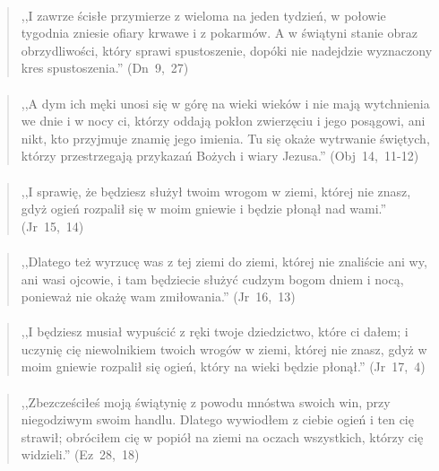 \documentclass[10pt,a4paper,oneside]{article}
\begin{document}
\paragraph{}
\begin{quote}
,,I zawrze ścisłe przymierze z wieloma na jeden tydzień, w połowie tygodnia zniesie ofiary krwawe i z pokarmów. A w świątyni stanie obraz obrzydliwości, który sprawi spustoszenie, dopóki nie nadejdzie wyznaczony kres spustoszenia.'' \mbox{(Dn 9, 27)}
\end{quote}
\paragraph{}
\begin{quote}
,,A dym ich męki unosi się w górę na wieki wieków i nie mają wytchnienia we dnie i w nocy ci, którzy oddają pokłon zwierzęciu i jego posągowi, ani nikt, kto przyjmuje znamię jego imienia. Tu się okaże wytrwanie świętych, którzy przestrzegają przykazań Bożych i wiary Jezusa.'' \mbox{(Obj 14, 11-12)}
\end{quote}
\paragraph{}
\begin{quote}
,,I sprawię, że będziesz służył twoim wrogom w ziemi, której nie znasz, gdyż ogień rozpalił się w moim gniewie i będzie płonął nad wami.'' \mbox{(Jr 15, 14)}
\end{quote}
\paragraph{}
\begin{quote}
,,Dlatego też wyrzucę was z tej ziemi do ziemi, której nie znaliście ani wy, ani wasi ojcowie, i tam będziecie służyć cudzym bogom dniem i nocą, ponieważ nie okażę wam zmiłowania.'' \mbox{(Jr 16, 13)}
\end{quote}
\paragraph{}
\begin{quote}
,,I będziesz musiał wypuścić z ręki twoje dziedzictwo, które ci dałem; i uczynię cię niewolnikiem twoich wrogów w ziemi, której nie znasz, gdyż w moim gniewie rozpalił się ogień, który na wieki będzie płonął.'' \mbox{(Jr 17, 4)}
\end{quote}
\paragraph{}
\begin{quote}
,,Zbezcześciłeś moją świątynię z powodu mnóstwa swoich win, przy niegodziwym swoim handlu. Dlatego wywiodłem z ciebie ogień i ten cię strawił; obróciłem cię w popiół na ziemi na oczach wszystkich, którzy cię widzieli.'' \mbox{(Ez 28, 18)}
\end{quote}
\end{document}
